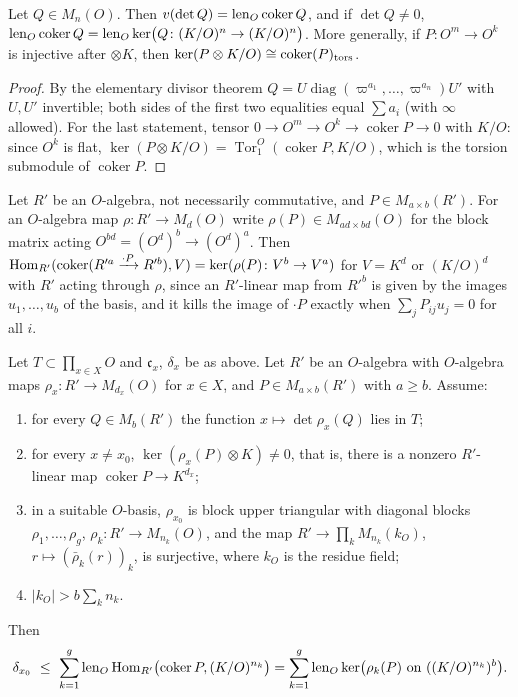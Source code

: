 \begin{lemma}\label{w4:lem:det}
Let $Q\in M_n(O)$. Then $v(\det Q)=\operatorname{len}_O\operatorname{coker}Q$, and if $\det Q\ne0$, $\operatorname{len}_O\operatorname{coker}Q=\operatorname{len}_O\ker\bigl(Q\colon(K/O)^n\to(K/O)^n\bigr)$. More generally, if $P\colon O^m\to O^k$ is injective after $\otimes K$, then $\ker(P\otimes K/O)\cong\operatorname{coker}(P)_{\rm tors}$.
\end{lemma}

\begin{proof}
By the elementary divisor theorem $Q=U\operatorname{diag}(\varpi^{a_1},\dots,\varpi^{a_n})U'$ with $U,U'$ invertible; both sides of the first two equalities equal $\sum a_i$ (with $\infty$ allowed). For the last statement, tensor $0\to O^m\to O^k\to\operatorname{coker}P\to0$ with $K/O$: since $O^k$ is flat, $\ker(P\otimes K/O)=\operatorname{Tor}_1^O(\operatorname{coker}P,K/O)$, which is the torsion submodule of $\operatorname{coker}P$.
\end{proof}

Let $R'$ be an $O$-algebra, not necessarily commutative, and $P\in M_{a\times b}(R')$. For an $O$-algebra map $\rho\colon R'\to M_d(O)$ write $\rho(P)\in M_{ad\times bd}(O)$ for the block matrix acting $O^{bd}=(O^d)^b\to(O^d)^a$. Then $\operatorname{Hom}_{R'}(\operatorname{coker}(R'^a\xrightarrow{\cdot P}R'^b),V)=\ker(\rho(P)\colon V^b\to V^a)$ for $V=K^d$ or $(K/O)^d$ with $R'$ acting through $\rho$, since an $R'$-linear map from $R'^b$ is given by the images $u_1,\dots,u_b$ of the basis, and it kills the image of $\cdot P$ exactly when $\sum_jP_{ij}u_j=0$ for all $i$.

\begin{proposition}\label{w4:prop:fitting}
Let $T\subset\prod_{x\in X}O$ and $\mathfrak c_x$, $\delta_x$ be as above. Let $R'$ be an $O$-algebra with $O$-algebra maps $\rho_x\colon R'\to M_{d_x}(O)$ for $x\in X$, and $P\in M_{a\times b}(R')$ with $a\ge b$. Assume:
\begin{enumerate}[leftmargin=*,label=(F\arabic*)]
\item for every $Q\in M_b(R')$ the function $x\mapsto\det\rho_x(Q)$ lies in $T$;
\item for every $x\ne x_0$, $\ker(\rho_x(P)\otimes K)\ne0$, that is, there is a nonzero $R'$-linear map $\operatorname{coker}P\to K^{d_x}$;
\item in a suitable $O$-basis, $\rho_{x_0}$ is block upper triangular with diagonal blocks $\rho_1,\dots,\rho_g$, $\rho_k\colon R'\to M_{n_k}(O)$, and the map $R'\to\prod_kM_{n_k}(k_O)$, $r\mapsto(\bar\rho_k(r))_k$, is surjective, where $k_O$ is the residue field;
\item $\lvert k_O\rvert>b\sum_kn_k$.
\end{enumerate}
Then
\[
\delta_{x_0}\ \le\ \sum_{k=1}^g\len_O\Hom_{R'}\bigl(\operatorname{coker}P,(K/O)^{n_k}\bigr)=\sum_{k=1}^g\len_O\ker\bigl(\rho_k(P)\ \text{on}\ ((K/O)^{n_k})^b\bigr).
\]
\end{proposition}

